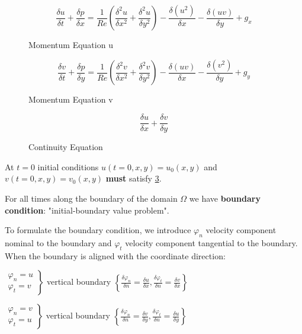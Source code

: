 \begin{figure}[H]
	\centering
	\[ \frac{\delta u}{\delta t} + \frac{\delta p}{\delta x} = \frac{1}{Re} \left( \frac{\delta^2 u}{\delta x^2} + \frac{\delta^2 u}{\delta y^2}\right) - \frac{\delta (u^2)}{\delta x} - \frac{\delta (uv)}{\delta y} + g_x\]
    \renewcommand{\thefigure}{2.2a}
	\caption{Momentum Equation u}
	\label{fig:momentuma}
\end{figure}
\begin{figure}[H]
	\centering
	\[ \frac{\delta v}{\delta t} + \frac{\delta p}{\delta y} = \frac{1}{Re} \left( \frac{\delta^2 v}{\delta x^2} + \frac{\delta^2 v}{\delta y^2}\right) - \frac{\delta (uv)}{\delta x} - \frac{\delta (v^2)}{\delta y} + g_y\]
    \renewcommand{\thefigure}{2.2b}
	\caption{Momentum Equation v}
	\label{fig:momentumb}
\end{figure}
\begin{figure}[H]
	\centering
	\[ \frac{\delta u}{\delta x} + \frac{\delta v}{\delta y}\]
    \renewcommand{\thefigure}{2.2c}
	\caption{Continuity Equation}
	\label{fig:cont}
\end{figure}


At $t = 0$ initial conditions $u(t=0, x,y) = u_0(x,y)$ and $v(t=0,x,y) = v_0(x,y)$ \textbf{must} satisfy \ref{fig:cont}.


For all times along the boundary of the domain $\Omega$ we have \textbf{boundary condition}: "initial-boundary value problem".

To formulate the boundary condition, we introduce $\varphi_n$ velocity component nominal to the boundary and $\varphi_t$ velocity component tangential to the boundary. When the boundary is aligned with the coordinate direction: 


$\left.\begin{matrix}
\varphi_n = u\\
\varphi_t = v
\end{matrix} \right\rbrace$ vertical boundary $\left\lbrace \frac{\delta \varphi_n}{\delta n} = \frac{\delta u}{\delta x},\frac{\delta \varphi_t}{\delta n} = \frac{\delta v}{\delta x} \right\rbrace$

$\left.\begin{matrix}
\varphi_n = v\\
\varphi_t = u
\end{matrix} \right\rbrace$ vertical boundary $\left\lbrace \frac{\delta \varphi_n}{\delta n} = \frac{\delta v}{\delta y},\frac{\delta \varphi_t}{\delta n} = \frac{\delta u}{\delta y} \right\rbrace$


